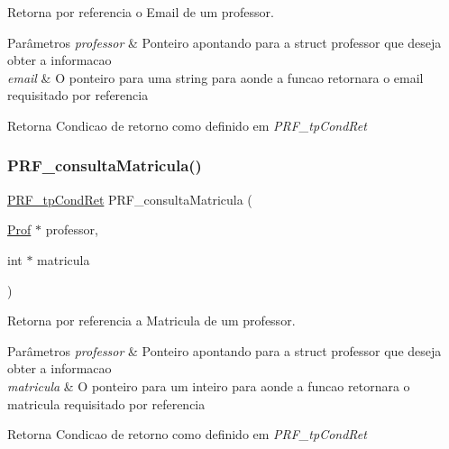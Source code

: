 Retorna por referencia o Email de um professor. 


\begin{DoxyParams}{Parâmetros}
{\em professor} & Ponteiro apontando para a struct professor que deseja obter a informacao \\
\hline
{\em email} & O ponteiro para uma string para aonde a funcao retornara o email requisitado por referencia \\
\hline
\end{DoxyParams}
\begin{DoxyReturn}{Retorna}
Condicao de retorno como definido em {\itshape P\+R\+F\+\_\+tp\+Cond\+Ret} 
\end{DoxyReturn}
\mbox{\label{group__funcoes_consulta_ga099afc8cbe22cd9570eda47c5d385296}} 
\subsubsection{\texorpdfstring{P\+R\+F\+\_\+consulta\+Matricula()}{PRF\_consultaMatricula()}}
{\footnotesize\ttfamily \hyperlink{group__modulo_professor_ga777e215896d573d2e99d98793b1f0ed1}{P\+R\+F\+\_\+tp\+Cond\+Ret} P\+R\+F\+\_\+consulta\+Matricula (\begin{DoxyParamCaption}\item[{\hyperlink{structprof}{Prof} $\ast$}]{professor,  }\item[{int $\ast$}]{matricula }\end{DoxyParamCaption})}



Retorna por referencia a Matricula de um professor. 


\begin{DoxyParams}{Parâmetros}
{\em professor} & Ponteiro apontando para a struct professor que deseja obter a informacao \\
\hline
{\em matricula} & O ponteiro para um inteiro para aonde a funcao retornara o matricula requisitado por referencia \\
\hline
\end{DoxyParams}
\begin{DoxyReturn}{Retorna}
Condicao de retorno como definido em {\itshape P\+R\+F\+\_\+tp\+Cond\+Ret} 
\end{DoxyReturn}
\mbox{\label{group__funcoes_consulta_gac2c49f880ea6cb477bb2695fb7dee346}} 
